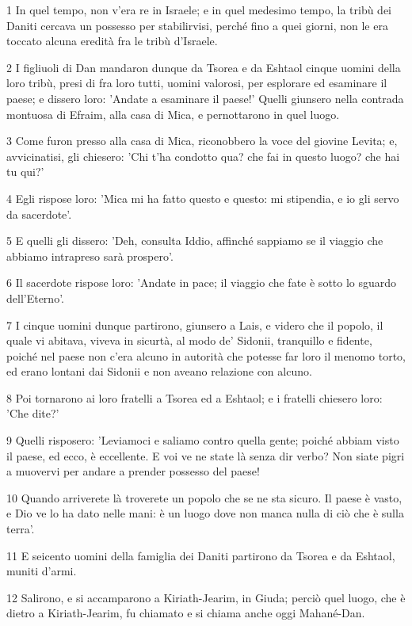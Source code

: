 \par 1 In quel tempo, non v'era re in Israele; e in quel medesimo tempo, la tribù dei Daniti cercava un possesso per stabilirvisi, perché fino a quei giorni, non le era toccato alcuna eredità fra le tribù d'Israele.
\par 2 I figliuoli di Dan mandaron dunque da Tsorea e da Eshtaol cinque uomini della loro tribù, presi di fra loro tutti, uomini valorosi, per esplorare ed esaminare il paese; e dissero loro: 'Andate a esaminare il paese!' Quelli giunsero nella contrada montuosa di Efraim, alla casa di Mica, e pernottarono in quel luogo.
\par 3 Come furon presso alla casa di Mica, riconobbero la voce del giovine Levita; e, avvicinatisi, gli chiesero: 'Chi t'ha condotto qua? che fai in questo luogo? che hai tu qui?'
\par 4 Egli rispose loro: 'Mica mi ha fatto questo e questo: mi stipendia, e io gli servo da sacerdote'.
\par 5 E quelli gli dissero: 'Deh, consulta Iddio, affinché sappiamo se il viaggio che abbiamo intrapreso sarà prospero'.
\par 6 Il sacerdote rispose loro: 'Andate in pace; il viaggio che fate è sotto lo sguardo dell'Eterno'.
\par 7 I cinque uomini dunque partirono, giunsero a Lais, e videro che il popolo, il quale vi abitava, viveva in sicurtà, al modo de' Sidonii, tranquillo e fidente, poiché nel paese non c'era alcuno in autorità che potesse far loro il menomo torto, ed erano lontani dai Sidonii e non aveano relazione con alcuno.
\par 8 Poi tornarono ai loro fratelli a Tsorea ed a Eshtaol; e i fratelli chiesero loro: 'Che dite?'
\par 9 Quelli risposero: 'Leviamoci e saliamo contro quella gente; poiché abbiam visto il paese, ed ecco, è eccellente. E voi ve ne state là senza dir verbo? Non siate pigri a muovervi per andare a prender possesso del paese!
\par 10 Quando arriverete là troverete un popolo che se ne sta sicuro. Il paese è vasto, e Dio ve lo ha dato nelle mani: è un luogo dove non manca nulla di ciò che è sulla terra'.
\par 11 E seicento uomini della famiglia dei Daniti partirono da Tsorea e da Eshtaol, muniti d'armi.
\par 12 Salirono, e si accamparono a Kiriath-Jearim, in Giuda; perciò quel luogo, che è dietro a Kiriath-Jearim, fu chiamato e si chiama anche oggi Mahané-Dan.
